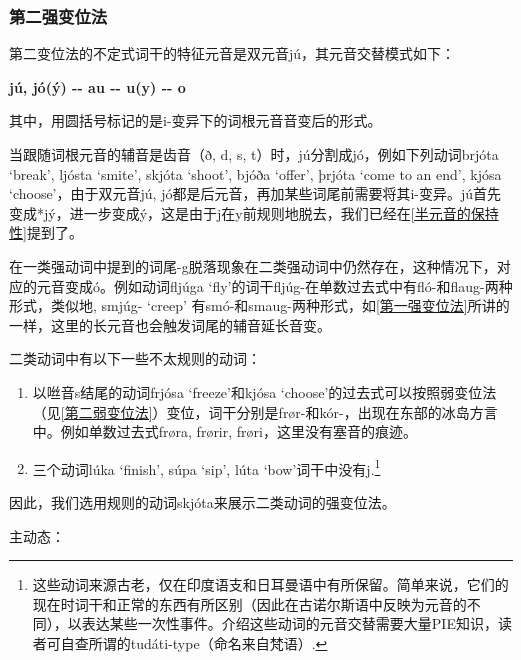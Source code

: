 \subsubsection{第二强变位法}\label{第二强变位法}

第二变位法的不定式词干的特征元音是双元音jú，其元音交替模式如下：

\textbf{jú, jó(ý) -\/- au -\/- u(y) -\/- o}

其中，用圆括号标记的是i-变异下的词根元音音变后的形式。

当跟随词根元音的辅音是齿音（ð, d, s,
t）时，jú分割成jó，例如下列动词brjóta `break‌', ljósta `smite‌', skjóta
`shoot‌', bjóða `offer‌', þrjóta `come to an end‌', kjósa
`choose‌'，由于双元音jú,
jó都是后元音，再加某些词尾前需要将其i-变异。jú首先变成*jý，进一步变成ý，这是由于j在y前规则地脱去，我们已经在\ref{半元音的保持性}提到了。

在一类强动词中提到的词尾-g脱落现象在二类强动词中仍然存在，这种情况下，对应的元音变成ó。例如动词fljúga
`fly‌'的词干fljúg-在单数过去式中有fló-和flaug-两种形式，类似地, smjúg-
`creep‌'
有smó-和smaug-两种形式，如\ref{第一强变位法}所讲的一样，这里的长元音也会触发词尾的辅音延长音变。

二类动词中有以下一些不太规则的动词：

\begin{enumerate}
\def\labelenumi{\arabic{enumi})}
\item
  以咝音s结尾的动词frjósa `freeze‌'和kjósa
  `choose‌'的过去式可以按照弱变位法（见\ref{第二弱变位法}）变位，词干分别是frør-和kór-，出现在东部的冰岛方言中。例如单数过去式frøra,
  frørir, frøri，这里没有塞音的痕迹。
\item
  三个动词lúka `finish‌', súpa `sip‌', lúta `bow‌'词干中没有j.\footnote{这些动词来源古老，仅在印度语支和日耳曼语中有所保留。简单来说，它们的现在时词干和正常的东西有所区别（因此在古诺尔斯语中反映为元音的不同），以表达某些一次性事件。介绍这些动词的元音交替需要大量PIE知识，读者可自查所谓的tudáti-type（命名来自梵语）.}
\end{enumerate}

因此，我们选用规则的动词skjóta来展示二类动词的强变位法。

主动态：

